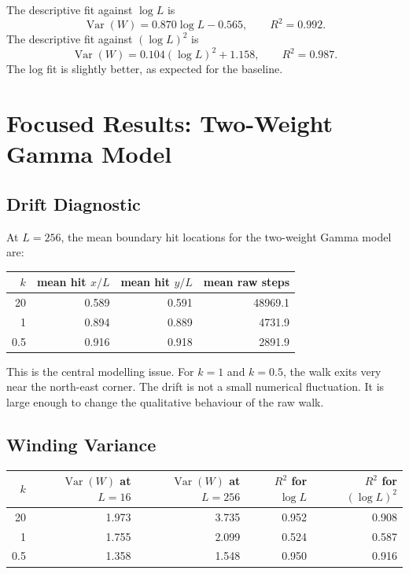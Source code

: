 \documentclass[11pt]{article}
\begin{document}
The descriptive fit against $\log L$ is
\[
  \operatorname{Var}(W) = 0.870 \log L - 0.565,
  \qquad R^2=0.992.
\]
The descriptive fit against $(\log L)^2$ is
\[
  \operatorname{Var}(W) = 0.104(\log L)^2 + 1.158,
  \qquad R^2=0.987.
\]
The log fit is slightly better, as expected for the baseline.

\section{Focused Results: Two-Weight Gamma Model}

\subsection{Drift Diagnostic}

At $L=256$, the mean boundary hit locations for the two-weight Gamma model are:

\begin{center}
\begin{tabular}{rrrr}
\toprule
$k$ & mean hit $x/L$ & mean hit $y/L$ & mean raw steps \\
\midrule
20  & 0.589 & 0.591 & 48969.1 \\
1   & 0.894 & 0.889 & 4731.9 \\
0.5 & 0.916 & 0.918 & 2891.9 \\
\bottomrule
\end{tabular}
\end{center}

This is the central modelling issue. For $k=1$ and $k=0.5$, the walk exits
very near the north-east corner. The drift is not a small numerical fluctuation.
It is large enough to change the qualitative behaviour of the raw walk.

\subsection{Winding Variance}

\begin{center}
\begin{tabular}{rrrrr}
\toprule
$k$ & $\operatorname{Var}(W)$ at $L=16$ &
$\operatorname{Var}(W)$ at $L=256$ &
$R^2$ for $\log L$ &
$R^2$ for $(\log L)^2$ \\
\midrule
20  & 1.973 & 3.735 & 0.952 & 0.908 \\
1   & 1.755 & 2.099 & 0.524 & 0.587 \\
0.5 & 1.358 & 1.548 & 0.950 & 0.916 \\
\bottomrule
\end{tabular}
\end{center}
\end{document}
